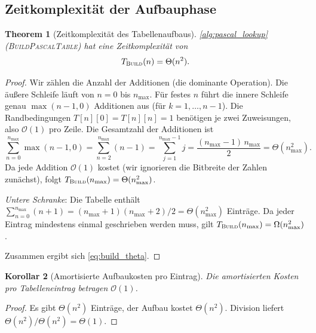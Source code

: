﻿\documentclass[12pt, a4paper]{article}
\newcommand{\Oh}{\mathcal{O}}
\newcommand{\build}{\textsc{Build}}
\theoremstyle{plain}
\newtheorem{theorem}{Theorem}[section]
\newtheorem{korollar}[theorem]{Korollar}
\theoremstyle{definition}
\theoremstyle{remark}
\renewcommand{\Oh}{\mathcal{O}}
\renewcommand{\build}{\textsc{Build}}
\begin{document}
\subsection{Zeitkomplexität der Aufbauphase}

\begin{theorem}[Zeitkomplexität des Tabellenaufbaus]
  \label{thm:aufbau_zeit}
  \cref{alg:pascal_lookup} (\textsc{BuildPascalTable}) hat eine
  Zeitkomplexität von
  \begin{equation}
    T_{\build}(n) = \Theta(n^2).
    \label{eq:build_theta}
  \end{equation}
\end{theorem}

\begin{proof}
  Wir zählen die Anzahl der Additionen (die dominante Operation).
  Die äußere Schleife läuft von $n = 0$ bis $n_{\max}$. Für festes $n$
  führt die innere Schleife genau $\max(n-1, 0)$ Additionen aus
  (für $k = 1, \ldots, n-1$). Die Randbedingungen $T[n][0] = T[n][n] = 1$
  benötigen je zwei Zuweisungen, also $\Oh(1)$ pro Zeile. Die
  Gesamtzahl der Additionen ist
  \begin{equation}
    \sum_{n=0}^{n_{\max}} \max(n-1, 0)
    = \sum_{n=2}^{n_{\max}} (n-1)
    = \sum_{j=1}^{n_{\max}-1} j
    = \frac{(n_{\max}-1)\,n_{\max}}{2}
    = \Theta(n_{\max}^2).
    \label{eq:aufbau_summe}
  \end{equation}
  Da jede Addition $\Oh(1)$ kostet (wir ignorieren die Bitbreite der
  Zahlen zunächst), folgt $T_{\build}(n_{\max}) = \Theta(n_{\max}^2)$.

  \emph{Untere Schranke}: Die Tabelle enthält
  $\sum_{n=0}^{n_{\max}}(n+1) = (n_{\max}+1)(n_{\max}+2)/2 = \Theta(n_{\max}^2)$
  Einträge. Da jeder Eintrag mindestens einmal geschrieben werden muss,
  gilt $T_{\build}(n_{\max}) = \Omega(n_{\max}^2)$.

  Zusammen ergibt sich \eqref{eq:build_theta}.
\end{proof}

\begin{korollar}[Amortisierte Aufbaukosten pro Eintrag]
  \label{kor:amortisiert_aufbau}
  Die amortisierten Kosten pro Tabelleneintrag betragen $\Oh(1)$.
\end{korollar}

\begin{proof}
  Es gibt $\Theta(n^2)$ Einträge, der Aufbau kostet $\Theta(n^2)$.
  Division liefert $\Theta(n^2)/\Theta(n^2) = \Theta(1)$.
\end{proof}
\end{document}
